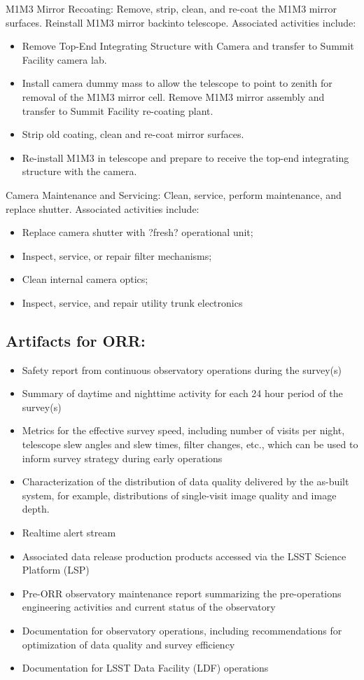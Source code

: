 M1M3 Mirror Recoating: Remove, strip, clean, and re-coat the M1M3 mirror surfaces. Reinstall M1M3 mirror backinto telescope. Associated activities include:

\begin{itemize}
\item Remove Top-End Integrating Structure with Camera and transfer to Summit Facility camera lab.
\item Install camera dummy mass to allow the telescope to point to zenith for removal of the M1M3 mirror cell. Remove M1M3 mirror assembly and transfer to Summit Facility re-coating plant.
\item Strip old coating, clean and re-coat mirror surfaces.
\item Re-install M1M3 in telescope and prepare to receive the top-end integrating structure with the camera.
\end{itemize}

Camera Maintenance and Servicing: Clean, service, perform maintenance, and replace shutter. Associated activities include:

\begin{itemize}
\item Replace camera shutter with ?fresh? operational unit;
\item Inspect, service, or repair filter mechanisms;
\item Clean internal camera optics;
\item Inspect, service, and repair utility trunk electronics
\end{itemize}

\subsection{Artifacts for ORR:}

\begin{itemize}
\item Safety report from continuous observatory operations during the survey(s)
\item Summary of daytime and nighttime activity for each 24 hour period of the survey(s)
\item Metrics for the effective survey speed, including number of visits per night, telescope slew angles and slew times, filter changes, etc., which can be used to inform survey strategy during early operations
\item Characterization of the distribution of data quality delivered by the as-built system, for example, distributions of single-visit image quality and image depth.
\item Realtime alert stream
\item Associated data release production products accessed via the LSST Science Platform (LSP)
\item Pre-ORR observatory maintenance report summarizing the pre-operations engineering activities and current status of the observatory
\item Documentation for observatory operations, including recommendations for optimization of data quality and survey efficiency
\item Documentation for LSST Data Facility (LDF) operations
\end{itemize}
